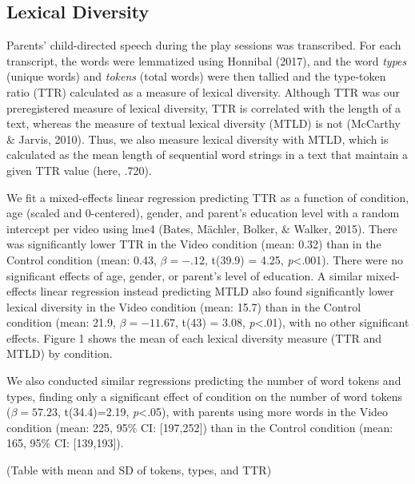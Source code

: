 \documentclass[10pt, letterpaper]{article}
\begin{document}
\subsection{Lexical Diversity}\label{lexical-diversity}

Parents' child-directed speech during the play sessions was transcribed.
For each transcript, the words were lemmatized using Honnibal (2017),
and the word \emph{types} (unique words) and \emph{tokens} (total words)
were then tallied and the type-token ratio (TTR) calculated as a measure
of lexical diversity. Although TTR was our preregistered measure of
lexical diversity, TTR is correlated with the length of a text, whereas
the measure of textual lexical diversity (MTLD) is not (McCarthy \&
Jarvis, 2010). Thus, we also measure lexical diversity with MTLD, which
is calculated as the mean length of sequential word strings in a text
that maintain a given TTR value (here, .720).

We fit a mixed-effects linear regression predicting TTR as a function of
condition, age (scaled and 0-centered), gender, and parent's education
level with a random intercept per video using lme4 (Bates, Mächler,
Bolker, \& Walker, 2015). There was significantly lower TTR in the Video
condition (mean: 0.32) than in the Control condition (mean: 0.43,
\(\beta=-.12\), t(39.9) = 4.25, \emph{p}\textless{}.001). There were no
significant effects of age, gender, or parent's level of education. A
similar mixed-effects linear regression instead predicting MTLD also
found significantly lower lexical diversity in the Video condition
(mean: 15.7) than in the Control condition (mean: 21.9,
\(\beta=-11.67\), t(43) = 3.08, \emph{p}\textless{}.01), with no other
significant effects. Figure 1 shows the mean of each lexical diversity
measure (TTR and MTLD) by condition.

We also conducted similar regressions predicting the number of word
tokens and types, finding only a significant effect of condition on the
number of word tokens (\(\beta=57.23\), t(34.4)=2.19,
\emph{p}\textless{}.05), with parents using more words in the Video
condition (mean: 225, 95\% CI: {[}197,252{]}) than in the Control
condition (mean: 165, 95\% CI: {[}139,193{]}).

(Table with mean and SD of tokens, types, and TTR)
\end{document}
